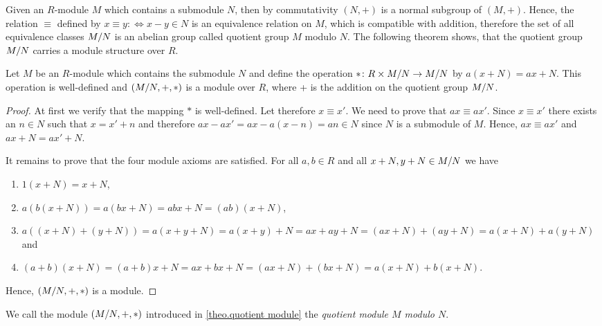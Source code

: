 Given an $R$-module $M$ which contains a submodule $N$, then by commutativity $(N,+)$ is a normal subgroup of $(M,+)$. Hence, the relation $\equiv$ defined by $x\equiv y:\Leftrightarrow x-y\in N$ is an equivalence relation on $M$, which is compatible with addition, therefore the set of all equivalence classes $M/N$ is an abelian group called quotient group $M$ modulo $N$. The following theorem shows, that the quotient group $M/N$ carries a module structure over $R$.

\begin{thm} \label{theo.quotient module}
Let $M$ be an $R$-module which contains the submodule $N$ and define the operation $\ast\colon R\times M/N\rightarrow M/N$ by $a(x+N)=ax+N$. This operation is well-defined and $(M/N,+,\ast)$ is a module over $R$, where + is the addition on the quotient group $M/N$.
\end{thm}

\begin{proof}
At first we verify that the mapping $\ast$ is well-defined. Let therefore $x\equiv x'$. We need to prove that $ax\equiv ax'$. Since $x\equiv x'$ there exists an $n\in N$ such that $x=x'+n$ and therefore $ax-ax'=ax-a(x-n)=an\in N$ since $N$ is a submodule of $M$. Hence, $ax\equiv ax'$ and $ax+N=ax'+N$. 

It remains to prove that the four module axioms are satisfied. For all $a,b\in R$ and all $x+N,y+N\in M/N$ we have
\begin{enumerate}
\item $1(x+N)=x+N$,
\item $a(b(x+N))=a(bx+N)=abx+N=(ab)(x+N)$,
\item $a((x+N)+(y+N))=a(x+y+N)=a(x+y)+N=ax+ay+N=(ax+N)+(ay+N)=a(x+N)+a(y+N)$ and
\item $(a+b)(x+N)=(a+b)x+N=ax+bx+N=(ax+N)+(bx+N)=a(x+N)+b(x+N)$.
\end{enumerate}
Hence, $(M/N,+,\ast)$ is a module.
\end{proof}

\begin{defin}
We call the module $(M/N,+,\ast)$ introduced in \cref{theo.quotient module} the \emph{quotient module $M$ modulo $N$}.
\end{defin}

